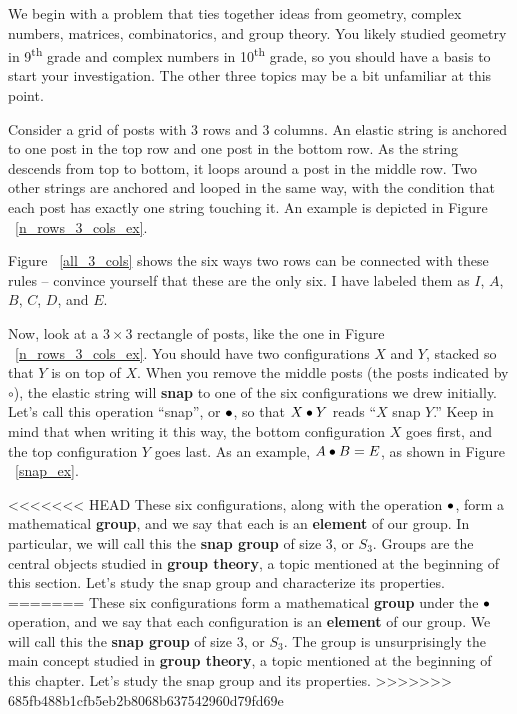 \documentclass[../gatm.tex]{subfiles}
\begin{document}

\noindent We begin with a problem that ties together ideas from geometry, complex numbers, matrices, combinatorics, and group theory. You likely studied geometry in 9\textsuperscript{th} grade and complex numbers in 10\textsuperscript{th} grade, so you should have a basis to start your investigation. The other three topics may be a bit unfamiliar at this point.

Consider a grid of posts with $3$ rows and $3$ columns. An elastic string is anchored to one post in the top row and one post in the bottom row. As the string descends from top to bottom, it loops around a post in the middle row. Two other strings are anchored and looped in the same way, with the condition that each post has exactly one string touching it. An example is depicted in Figure ~\ref{n_rows_3_cols_ex}.

Figure ~\ref{all_3_cols} shows the six ways two rows can be connected with these rules -- convince yourself that these are the only six. I have labeled them as $I$, $A$, $B$, $C$, $D$, and $E$.



Now, look at a $3\times 3$ rectangle of posts, like the one in Figure ~\ref{n_rows_3_cols_ex}. You should have two configurations $X$ and $Y$, stacked so that $Y$ is on top of $X$. When you remove the middle posts (the posts indicated by $\circ$), the elastic string will \textbf{snap} to one of the six configurations we drew initially. Let's call this operation ``snap'', or $\bullet$, so that $X\bullet Y$ reads ``$X$ snap $Y$.'' Keep in mind that when writing it this way, the bottom configuration $X$ goes first, and the top configuration $Y$ goes last. As an example, $A\bullet B = E$, as shown in Figure ~\ref{snap_ex}.

<<<<<<< HEAD
These six configurations, along with the operation $\bullet$, form a mathematical \textbf{group}, and we say that each is an \textbf{element} of our group. In particular, we will call this the \textbf{snap group} of size $3$, or $S_3$. Groups are the central objects studied in \textbf{group theory}, a topic mentioned at the beginning of this section. Let's study the snap group and characterize its properties.
=======
These six configurations form a mathematical \textbf{group} under the $\bullet$ operation, and we say that each configuration is an \textbf{element} of our group. We will call this the \textbf{snap group} of size $3$, or $S_3$. The group is unsurprisingly the main concept studied in \textbf{group theory}, a topic mentioned at the beginning of this chapter. Let's study the snap group and its properties.
>>>>>>> 685fb488b1cfb5eb2b8068b637542960d79fd69e
\end{document}
